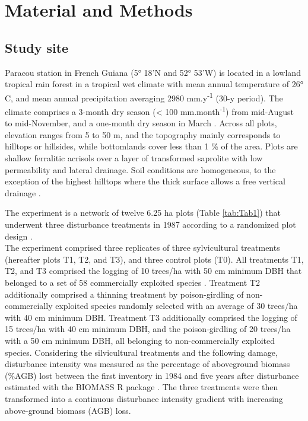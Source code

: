 \documentclass[fleqn,10pt]{ArtEcoFoG} %
\theoremstyle{definition}
\theoremstyle{definition}
\theoremstyle{definition}
\theoremstyle{remark}
\begin{document}
\section{Material and Methods}\label{material-and-methods}

\subsection{Study site}\label{study-site}

Paracou station in French Guiana (5° 18'N and 52° 53'W) is located in a
lowland tropical rain forest in a tropical wet climate with mean annual
temperature of 26° C, and mean annual precipitation averaging 2980
mm.y\textsuperscript{-1} (30-y period). The climate comprises a 3-month
dry season (\textless{} 100 mm.month\textsuperscript{-1}) from
mid-August to mid-November, and a one-month dry season in March
\citep{Wagner2011}. Across all plots, elevation ranges from 5 to 50 m,
and the topography mainly corresponds to hilltops or hillsides, while
bottomlands cover less than 1 \% of the area. Plots are shallow
ferralitic acrisols over a layer of transformed saprolite with low
permeability and lateral drainage. Soil conditions are homogeneous, to
the exception of the highest hilltops where the thick surface allows a
free vertical drainage \citep{Gourlet-Fleury2004}.

The experiment is a network of twelve 6.25 ha plots (Table
\ref{tab:Tab1}) that underwent three disturbance treatments in 1987
according to a randomized plot design \citep{Gourlet-Fleury2004}.\\
The experiment comprised three replicates of three sylvicultural
treatments (hereafter plots T1, T2, and T3), and three control plots
(T0). All treatments T1, T2, and T3 comprised the logging of 10 trees/ha
with 50 cm minimum DBH that belonged to a set of 58 commercially
exploited species \citep{Gourlet-Fleury2004}. Treatment T2 additionally
comprised a thinning treatment by poison-girdling of non-commercially
exploited species randomly selected with an average of 30 trees/ha with
40 cm minimum DBH. Treatment T3 additionally comprised the logging of 15
trees/ha with 40 cm minimum DBH, and the poison-girdling of 20 trees/ha
with a 50 cm minimum DBH, all belonging to non-commercially exploited
species. Considering the silvicultural treatments and the following
damage, disturbance intensity was measured as the percentage of
aboveground biomass (\%AGB) lost between the first inventory in 1984 and
five years after disturbance \citep{Piponiot2016} estimated with the
BIOMASS R package \citep{Rejou2017}. The three treatments were then
transformed into a continuous disturbance intensity gradient with
increasing above-ground biomass (AGB) loss.
\end{document}
